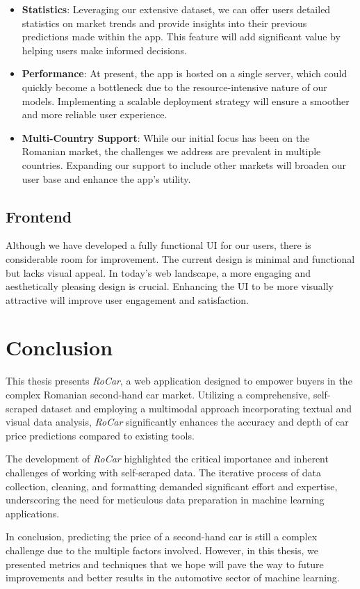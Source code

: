 \begin{itemize}
\item \textbf{Statistics}: Leveraging our extensive dataset, we can offer users detailed statistics on market trends and provide insights into their previous predictions made within the app. This feature will add significant value by helping users make informed decisions.
\item \textbf{Performance}: At present, the app is hosted on a single server, which could quickly become a bottleneck due to the resource-intensive nature of our models. Implementing a scalable deployment strategy will ensure a smoother and more reliable user experience.
\item \textbf{Multi-Country Support}: While our initial focus has been on the Romanian market, the challenges we address are prevalent in multiple countries. Expanding our support to include other markets will broaden our user base and enhance the app's utility.
\end{itemize}

\subsection{Frontend}

Although we have developed a fully functional UI for our users, there is considerable room for improvement. The current design is minimal and functional but lacks visual appeal. In today's web landscape, a more engaging and aesthetically pleasing design is crucial. Enhancing the UI to be more visually attractive will improve user engagement and satisfaction.

\section{Conclusion}

This thesis presents \textit{RoCar}, a web application designed to empower buyers in the complex Romanian second-hand car market. Utilizing a comprehensive, self-scraped dataset and employing a multimodal approach incorporating textual and visual data analysis, \textit{RoCar} significantly enhances the accuracy and depth of car price predictions compared to existing tools.

The development of \textit{RoCar} highlighted the critical importance and inherent challenges of working with self-scraped data. The iterative process of data collection, cleaning, and formatting demanded significant effort and expertise, underscoring the need for meticulous data preparation in machine learning applications.

In conclusion, predicting the price of a second-hand car is still a complex challenge due to the multiple factors involved. However, in this thesis, we presented metrics and techniques that we hope will pave the way to future improvements and better results in the automotive sector of machine learning.
